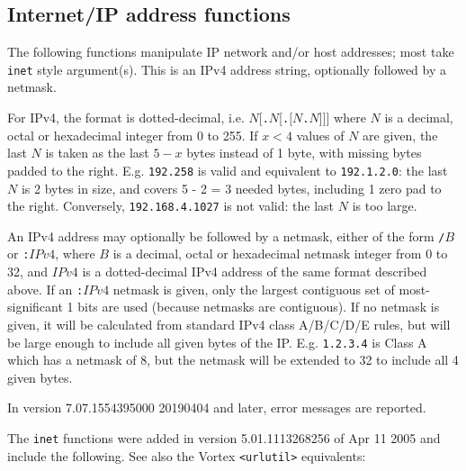 \subsection{Internet/IP address functions}

The following functions manipulate IP network and/or host addresses;
most take \verb`inet` style argument(s).
This is an IPv4
address string, optionally followed by a netmask.

For IPv4, the format is dotted-decimal, i.e.
$N$[{\tt .}$N$[{\tt .}$[N${\tt .}$N$]]] where $N$ is a decimal, octal
or hexadecimal integer from 0 to 255.  If $x < 4$ values of $N$ are
given, the last $N$ is taken as the last $5-x$ bytes instead of 1
byte, with missing bytes padded to the right.  E.g. {\tt 192.258} is
valid and equivalent to {\tt 192.1.2.0}: the last $N$ is 2 bytes in
size, and covers 5 - 2 = 3 needed bytes, including 1 zero pad to the
right.  Conversely, {\tt 192.168.4.1027} is not valid: the last $N$
is too large.

An IPv4 address may optionally be followed by a netmask, either of
the form {\tt /}$B$ or {\tt :}$IPv4$, where $B$ is a decimal, octal or
hexadecimal netmask integer from 0 to 32, and $IPv4$ is a
dotted-decimal IPv4 address of the same format described above.  If an
{\tt :}$IPv4$ netmask is given, only the largest contiguous set of
most-significant 1 bits are used (because netmasks are contiguous).
If no netmask is given, it will be calculated from standard IPv4 class
A/B/C/D/E rules, but will be large enough to include all given bytes
of the IP.  E.g. {\tt 1.2.3.4} is Class A which has a netmask of 8,
but the netmask will be extended to 32 to include all 4 given bytes.


In version 7.07.1554395000 20190404 and later, error messages are
reported.

  The \verb`inet` functions were added in version 5.01.1113268256 of
Apr 11 2005 and include the following.  See also the Vortex
\verb`<urlutil>` equivalents:


